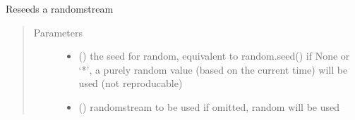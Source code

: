 \documentclass[letterpaper,10pt,english]{sphinxmanual}
\begin{document}

\begin{fulllineitems}
\label{\detokenize{Reference:salabim.random_seed}}
Reseeds a randomstream
\begin{quote}\begin{description}
\item[{Parameters}] \leavevmode\begin{itemize}
\item {} 
 (\sphinxstyleliteralemphasis{\sphinxupquote{, }}) \textendash{} the seed for random, equivalent to random.seed() 
if None or ‘*’, a purely random value (based on the current time) will be used
(not reproducable) 

\item {} 
 () \textendash{} randomstream to be used 
if omitted, random will be used 

\end{itemize}

\end{description}\end{quote}

\end{fulllineitems}

\end{document}
